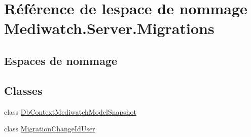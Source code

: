 \hypertarget{namespace_mediwatch_1_1_server_1_1_migrations}{}\section{Référence de l\textquotesingle{}espace de nommage Mediwatch.\+Server.\+Migrations}
\label{namespace_mediwatch_1_1_server_1_1_migrations}
\subsection*{Espaces de nommage}
\begin{DoxyCompactItemize}
\end{DoxyCompactItemize}
\subsection*{Classes}
\begin{DoxyCompactItemize}
\item 
class \hyperlink{class_mediwatch_1_1_server_1_1_migrations_1_1_db_context_mediwatch_model_snapshot}{Db\+Context\+Mediwatch\+Model\+Snapshot}
\item 
class \hyperlink{class_mediwatch_1_1_server_1_1_migrations_1_1_migration_change_id_user}{Migration\+Change\+Id\+User}
\end{DoxyCompactItemize}
